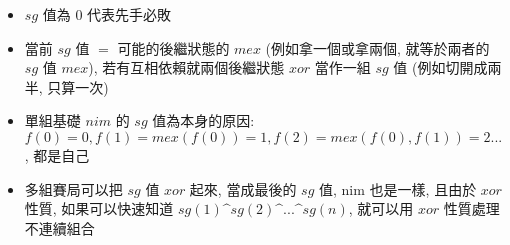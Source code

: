 \begin{itemize}
    \item $sg$ 值為 $0$ 代表先手必敗
    \item 當前 $sg$ 值 $=$ 可能的後繼狀態的 $mex$ (例如拿一個或拿兩個, 就等於兩者的 $sg$ 值 $mex$), 若有互相依賴就兩個後繼狀態 $xor$ 當作一組 $sg$ 值 (例如切開成兩半, 只算一次)
    \item 單組基礎 $nim$ 的 $sg$ 值為本身的原因: $f(0) = 0, f(1) = mex(f(0)) = 1, f(2) = mex(f(0), f(1)) = 2 ...$, 都是自己
    \item 多組賽局可以把 $sg$ 值 $xor$ 起來, 當成最後的 $sg$ 值, nim 也是一樣, 且由於 $xor$ 性質, 如果可以快速知道 $sg(1) \^ sg(2) \^ ... \^ sg(n)$, 就可以用 $xor$ 性質處理不連續組合
\end{itemize}